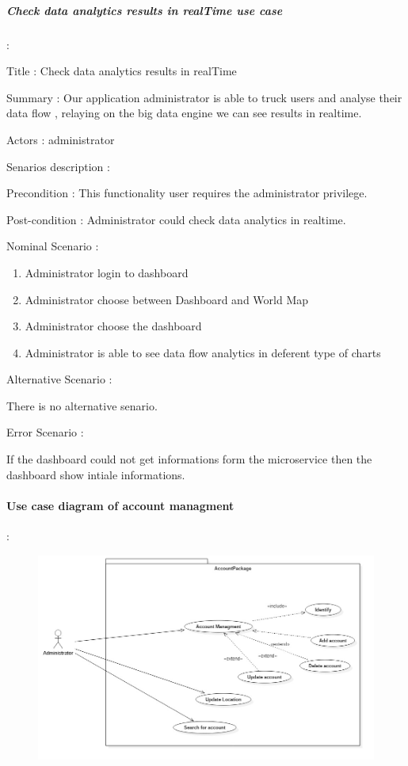 \subparagraph{Check data analytics results in realTime use case} :
\label{sec:sec01} 
\begin{flushleft}

Title : Check data analytics results in realTime

Summary : Our application administrator is able to truck users and analyse their data flow , relaying on
the big data engine we can see results in realtime.

Actors : administrator

Senarios description : 

Precondition : This functionality user requires the administrator privilege.

Post-condition : Administrator could check data analytics in realtime.

Nominal Scenario :

 \begin{enumerate}
   \item Administrator login to dashboard
   \item Administrator choose between Dashboard and World Map
   \item Administrator choose the dashboard 
   \item Administrator is able to see data flow analytics in deferent type of charts
 \end{enumerate}

Alternative Scenario :

There is no alternative senario.

Error Scenario :

If the dashboard could not get informations form the microservice then the dashboard show intiale informations.
\end{flushleft}

\paragraph{Use case diagram of account managment} :
\label{sec:sec01}

 \begin{figure}[H]
	\centering
	\includegraphics[height=0.3\textheight]{fig01/userMangment}
	\label{fig:FilialesEtClients}
\end{figure}

